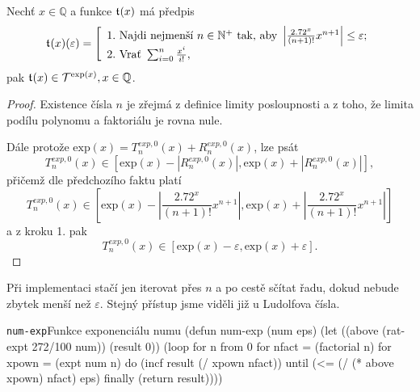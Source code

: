 \begin{consequence}
Nechť $x\in\mathbb{Q}$ a funkce $\mathfrak{t}^{}(x)$ má předpis
\begin{equation}
\mathfrak{t}^{}(x)(\varepsilon)=\left[\begin{array}{l}\mathrm{1.~}\text{Najdi~nejmenší~}n\in\mathbb{N}^+\text{~tak,~aby~}\left|\frac{2.72^x}{(n+1)!}x^{n+1}\right| \leq \varepsilon;\\
\mathrm{2.~}\text{Vrať~}\sum_{i=0}^n \frac{x^i}{i!},\end{array}\right.
\end{equation}
pak $\mathfrak{t}^{}(x)\in\mathcal{T}^{\mathrm{exp}(x)},x\in\mathbb{Q}$.
\begin{proof}
Existence čísla $n$ je zřejmá z definice limity posloupnosti a z toho, že limita podílu polynomu a faktoriálu je rovna nule.

Dále protože $\mathrm{exp}(x) = T^{exp, 0}_n(x)+R^{exp, 0}_n(x)$, lze psát
\begin{equation}
T^{exp, 0}_n(x) \in [\mathrm{exp}(x) - |R^{exp, 0}_n(x)|, \mathrm{exp}(x) + |R^{exp, 0}_n(x)|],
\end{equation}
přičemž dle předchozího faktu platí
\begin{equation}
T^{exp, 0}_n(x) \in \left[\mathrm{exp}(x) - \left| \frac{2.72^x}{(n+1)!}x^{n+1} \right|, \mathrm{exp}(x) + \left| \frac{2.72^x}{(n+1)!}x^{n+1} \right|\right]
\end{equation}
a z kroku 1. pak
\begin{equation}
T^{exp, 0}_n(x) \in [\mathrm{exp}(x) - \varepsilon, \mathrm{exp}(x) + \varepsilon].
\end{equation}
\end{proof}
\end{consequence}

Při implementaci stačí jen iterovat přes $n$ a po cestě sčítat řadu, dokud nebude zbytek menší než $\varepsilon$. Stejný přístup jsme viděli již u Ludolfova čísla.

\begin{lispcode}{\texttt{num-exp}}{Funkce exponenciálu numu}
(\textcolor{funkcionalni}{defun} \textcolor{pojmenovan}{num-exp} (num eps)
  (\textcolor{vedlejsi}{let} ((above (\textcolor{moje}{rat-expt} 272/100 num)) (result 0))
    (\textcolor{funkcionalni}{loop} \textcolor{obarvi}{for} n \textcolor{obarvi}{from} 0
          \textcolor{obarvi}{for} nfact = (\textcolor{moje}{factorial} n)
          \textcolor{obarvi}{for} xpown = (\textcolor{matematicke}{expt} num n)
          \textcolor{obarvi}{do} (\textcolor{vedlejsi}{incf} result (\textcolor{matematicke}{/} xpown nfact))
          \textcolor{obarvi}{until} (\textcolor{matematicke}{<=} (\textcolor{matematicke}{/} (\textcolor{matematicke}{*} above xpown) nfact) eps)
          \textcolor{obarvi}{finally} (\textcolor{funkcionalni}{return} result))))
\end{lispcode}

